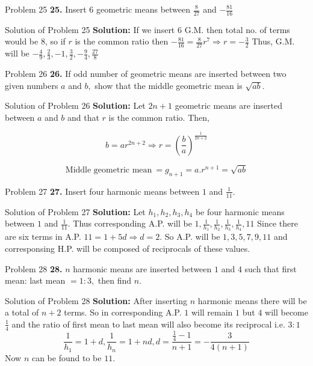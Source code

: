 \documentclass[aspectratio=1610,8pt]{beamer}
\begin{document}
\begin{frame}{Problem 25}
  \textbf{25.} Insert $6$ geometric means between $\frac{8}{27}$ and
  $-\frac{81}{16}$
\end{frame}
\begin{frame}{Solution of Problem 25}
  \textbf{Solution:} If we insert $6$ G.M. then total no. of terms would be
  $8$, so if $r$ is the common ratio then $-\frac{81}{16} = \frac{8}{27}r^7
  \Rightarrow r = -\frac{3}{2}$
  \linebreak
  \linebreak
  Thus, G.M. will be $-\frac{4}{9}, \frac{2}{3}, -1, \frac{3}{2}, -\frac{9}{4},
  \frac{27}{8}$
\end{frame}
\begin{frame}{Problem 26}
  \textbf{26.} If odd number of geometric means are inserted between two given
  numbers $a$ and $b,$ show that the middle geometric mean is $\sqrt{ab}.$
\end{frame}
\begin{frame}{Solution of Problem 26}
  \textbf{Solution:} Let $2n + 1$ geometric means are inserted between $a$ and
  $b$ and that $r$ is the common ratio. Then,

  $$b = ar^{2n + 2} \Rightarrow r = \left(\frac{b}{a}\right)^{\frac{1}{2n +
      2}}$$

  $$\text{Middle geometric mean}~ = g_{n + 1} = a.r^{n + 1} = \sqrt{ab}$$
\end{frame}
\begin{frame}{Problem 27}
  \textbf{27.} Insert four harmonic means between $1$ and $\frac{1}{11}.$
\end{frame}
\begin{frame}{Solution of Problem 27}
  \textbf{Solution:} Let $h_1, h_2, h_3, h_4$ be four harmonic means between
  $1$ and $\frac{1}{11}$. Thus corresponding A.P. will be $1, \frac{1}{h_1},
  \frac{1}{h_2}, \frac{1}{h_3}, \frac{1}{h_4}, 11$
  \linebreak
  \linebreak
  Since there are six terms in A.P. $11 = 1 + 5d \Rightarrow d = 2.$
  So A.P. will be $1, 3, 5, 7, 9, 11$ and corresponsing H.P. will be composed
  of reciprocals of these values.
\end{frame}
\begin{frame}{Problem 28}
  \textbf{28.} $n$ harmonic means are inserted between $1$ and $4$ such that
  first mean: last mean $= 1:3,$ then find $n.$
\end{frame}
\begin{frame}{Solution of Problem 28}
  \textbf{Solution:} After inserting $n$ harmonic means there will be a total
  of $n + 2$ terms. So in corresponding A.P. $1$ will remain $1$ but $4$ will
  become $\frac{1}{4}$ and the ratio of first mean to last mean will also
  become its reciprocal i.e. $3:1$
  \linebreak
  \linebreak
  $$\frac{1}{h_1} = 1 + d, \frac{1}{h_n} = 1 + nd, d = \frac{\frac{1}{4} -
    1}{n + 1}= -\frac{3}{4(n + 1)}$$
  \linebreak
  \linebreak
  Now $n$ can be found to be $11.$
\end{frame}
\end{document}

